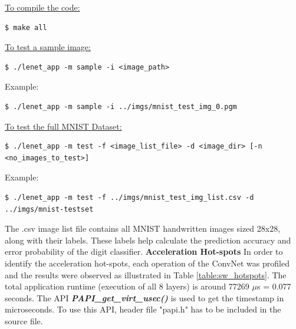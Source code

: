 \underline{To compile the code:}
\begin{scriptsize}
\linuxbash
\begin{lstlisting}
$ make all
\end{lstlisting}
\end{scriptsize}
\underline{To test a sample image:}
\begin{scriptsize}
\linuxbash
\begin{lstlisting}
$ ./lenet_app -m sample -i <image_path>
\end{lstlisting}
\end{scriptsize}
Example: 
\begin{scriptsize}
\linuxbash
\begin{lstlisting}
$ ./lenet_app -m sample -i ../imgs/mnist_test_img_0.pgm
\end{lstlisting}
\end{scriptsize}
\underline{To test the full MNIST Dataset:}
\begin{scriptsize}
\linuxbash
\begin{lstlisting}
$ ./lenet_app -m test -f <image_list_file> -d <image_dir> [-n <no_images_to_test>]
\end{lstlisting}
\end{scriptsize}
Example: 
\begin{scriptsize}
\linuxbash
\begin{lstlisting}
$ ./lenet_app -m test -f ../imgs/mnist_test_img_list.csv -d ../imgs/mnist-testset
\end{lstlisting}
\end{scriptsize}
The .csv image list file contains all MNIST handwritten images sized 28x28, along with their labels. These labels help calculate the prediction accuracy and error probability of the digit classifier.\newline
\textbf{Acceleration Hot-spots} \newline 
In order to identify the acceleration hot-spots, each operation of the ConvNet was profiled and the results were observed as illustrated in Table \ref{table:sw_hotspots}. The total application runtime (execution of all 8 layers) is around 77269 $\mu$s = 0.077 seconds. The API \textit{\textbf{PAPI\_get\_virt\_usec()}} is used to get the timestamp in microseconds. To use this API, header file "papi.h" has to be included in the source file.

